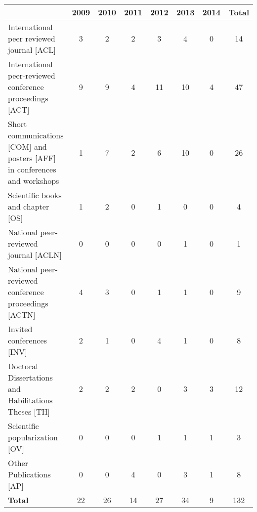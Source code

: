 \begin{center}\begin{tabular}{|p{6cm}|*{7}{c|}}
\hline
~ &2009 &2010 &2011 &2012 &2013 &2014 & \textbf{Total} \\
\hline
International peer reviewed journal [ACL] & 3  & 2  & 2  & 3  & 4  & 0  & 14 \\
\hline
International peer-reviewed conference proceedings [ACT] & 9  & 9 & 4  & 11  & 10  & 4  & 47 \\
\hline
Short communications [COM] and posters [AFF] in conferences and workshops & 1  & 7  & 2  & 6  & 10  & 0  & 26 \\
\hline
Scientific books and chapter [OS] & 1  & 2  & 0  & 1 & 0  & 0  & 4 \\
\hline
National peer-reviewed journal  [ACLN] & 0  & 0  & 0  & 0  & 1  & 0  & 1 \\
\hline
National peer-reviewed conference proceedings [ACTN] & 4  & 3  & 0  & 1  & 1  & 0  & 9 \\
\hline
Invited conferences [INV] & 2  & 1  & 0  & 4  & 1  & 0  & 8 \\
\hline
Doctoral Dissertations and Habilitations Theses [TH] & 2  & 2  & 2  & 0  & 3  & 3  & 12 \\
\hline
Scientific popularization [OV] & 0  & 0  & 0  & 1 & 1 & 1  & 3\\
\hline
Other Publications [AP] & 0  & 0  & 4  & 0 & 3  & 1  & 8 \\
\hline \textbf{Total} &22&26&14&27&34&9&132\\\hline
\end{tabular}\end{center}
\makeatother





 

